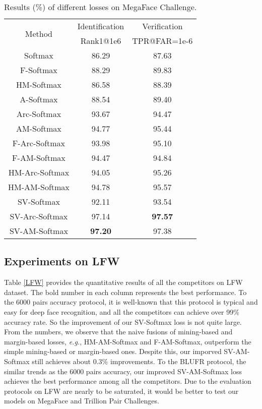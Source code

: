 \documentclass[10pt,twocolumn,letterpaper]{article}
\begin{document}
\begin{table}
\begin{center}
\begin{tabular}{|c|c|c| }
\hline
\multirow{2}{*}{Method}  & Identification     & Verification  \\
        & Rank1@1e6          & TPR@FAR=1e-6 \\
\hline\hline
Softmax                         & 86.29 & 87.63  \\
\hline
F-Softmax   \cite{Focal}        & 88.29 & 89.83 \\
HM-Softmax  \cite{OHEM}         & 86.58 & 88.39 \\
\hline
A-Softmax   \cite{SphereFace}   & 88.54 & 89.40  \\
Arc-Softmax \cite{Arc-Softmax}  & 93.67	& 94.47  \\
AM-Softmax  \cite{AM-Softmax}   & 94.77	& 95.44  \\
\hline
F-Arc-Softmax                   & 93.98 & 95.10 \\
F-AM-Softmax                    & 94.47 & 94.84 \\
HM-Arc-Softmax                  & 94.05 & 95.26 \\
HM-AM-Softmax                   & 94.78 & 95.57 \\
\hline
SV-Softmax             & 92.11 & 93.54   \\
SV-Arc-Softmax         & 97.14 & \textbf{97.57}  \\
SV-AM-Softmax          & \textbf{97.20} & 97.38  \\
\hline
\end{tabular}
\end{center}		
\caption{Results (\%) of different losses on MegaFace Challenge.}
\label{MegaFace}
\end{table}

\subsection{Experiments on LFW}
Table \ref{LFW} provides the quantitative results of all the competitors on LFW dataset. The bold number in each column represents the best performance. To the 6000 pairs accuracy protocol, it is well-known that this protocol is typical and easy for deep face recognition, and all the competitors can achieve over 99\% accuracy rate. So the improvement of our SV-Softmax loss is not quite large. From the numbers, we observe that the naive fusions of mining-based and margin-based losses, \textit{e.g.}, HM-AM-Softmax and F-AM-Softmax, outperform the simple mining-based or margin-based ones.  Despite this, our imporved SV-AM-Softmax still achieves about 0.3\% improvements. To the BLUFR protocol, the similar trends as the 6000 pairs accuracy, our improved SV-AM-Softmax loss achieves the best performance among all the competitors. Due to the evaluation protocols on LFW are nearly to be saturated, it would be better to test our models on MegaFace and Trillion Pair Challenges.
\end{document}
